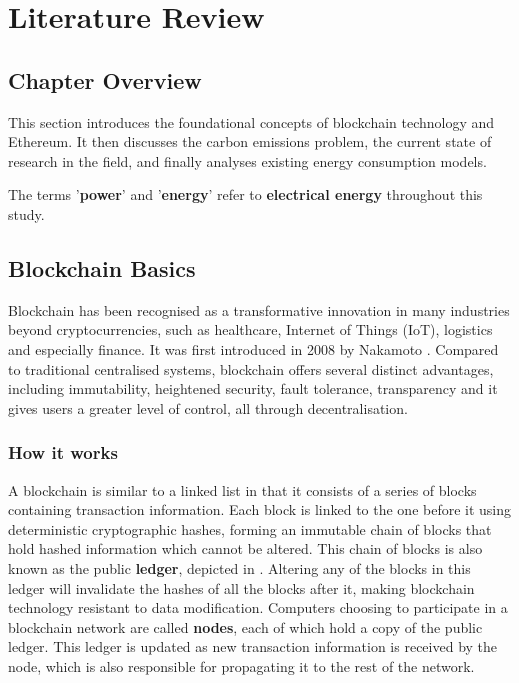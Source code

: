 \chapter{Literature Review}
\section{Chapter Overview}

This section introduces the foundational concepts of blockchain technology and Ethereum. It then discusses the carbon emissions problem, the current state of research in the field, and finally analyses existing energy consumption models.

The terms '\textbf{power}' and '\textbf{energy}' refer to \textbf{electrical energy} throughout this study. 


\section{Blockchain Basics}

Blockchain has been recognised as a transformative innovation in many industries beyond cryptocurrencies, such as  healthcare, Internet of Things (IoT), logistics and especially finance. It was first introduced in 2008 by Nakamoto \cite{NakamotoBitcoin:System}. Compared to traditional centralised systems, blockchain offers several distinct advantages, including immutability, heightened security, fault tolerance, transparency and it gives users a greater level of control, all through decentralisation.

\subsection{How it works}

A blockchain is similar to a linked list in that it consists of a series of blocks containing transaction information. Each block is linked to the one before it using deterministic cryptographic hashes, forming an immutable chain of blocks that hold hashed information which cannot be altered. This chain of blocks is also known as the public \textbf{ledger}, depicted in . Altering any of the blocks in this ledger will invalidate the hashes of all the blocks after it, making blockchain technology resistant to data modification. Computers choosing to participate in a blockchain network are called \textbf{nodes}, each of which hold a copy of the public ledger. This ledger is updated as new transaction information is received by the node, which is also responsible for propagating it to the rest of the network.

